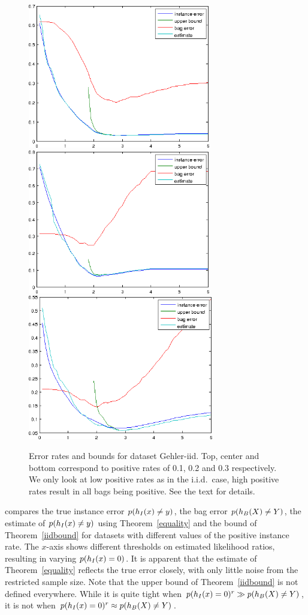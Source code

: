 \begin{figure}[tbp]
	\begin{center}
		\includegraphics[height=63mm]{images/iid_01.png}
		\includegraphics[height=63mm]{images/iid_02.png}
		\includegraphics[height=63mm]{images/iid_03.png}
	\end{center}
	\caption{Error rates and bounds for dataset Gehler-iid. Top, center and bottom correspond to positive rates of 0.1, 0.2 and 0.3 respectively.
    We only look at low positive rates as in the i.i.d.\ case, high positive rates result in all bags being positive.
    See the text for details.}
\end{figure}

 compares the true instance error $p(h_I(x) \neq y)$, the bag error $p(h_B(X) \neq Y)$, the estimate of $p(h_I(x) \neq y)$ using Theorem~\ref{equality}
and the bound of Theorem~\ref{iidbound} for datasets with different values of the positive instance rate.
The $x$-axis shows different thresholds on estimated likelihood ratios, resulting in varying $p(h_I(x)=0)$.
It is apparent that the estimate of Theorem~\ref{equality} reflects the true error closely, with only little noise from the restricted
sample size. Note that the upper bound of Theorem~\ref{iidbound} is not defined everywhere. While it is quite tight when
$p(h_I(x)=0)^r \gg p(h_B(X) \neq Y)$, it is not when $p(h_I(x)=0)^r \approx p(h_B(X) \neq Y)$.


